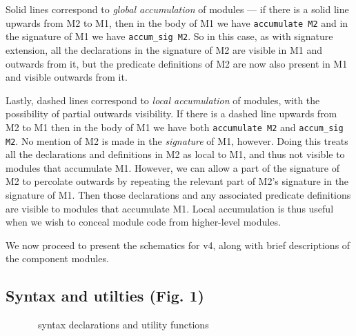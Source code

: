 Solid lines correspond to \emph{global accumulation} of modules --- if
there is a solid line upwards from M2 to M1, then in the body of M1 we
have {\tt accumulate M2} and in the signature of M1 we have
{\tt accum\_sig M2}.  So in this case, as with signature extension, all
the declarations in the signature of M2 are visible in M1 and outwards
from it, but the predicate definitions of M2 are now also present in
M1 and visible outwards from it.

Lastly, dashed lines correspond to \emph{local accumulation} of
modules, with the possibility of partial outwards visibility.  If
there is a dashed line upwards from M2 to M1 then in the body of M1 we
have both {\tt accumulate M2} and {\tt accum\_sig M2}.  No mention of
M2 is made in the \emph{signature} of M1, however.  Doing this treats
all the declarations and definitions in M2 as local to M1, and thus
not visible to modules that accumulate M1.  However, we can allow a
part of the signature of M2 to percolate outwards by repeating the
relevant part of M2's signature in the signature of M1.  Then those
declarations and any associated predicate definitions are visible to
modules that accumulate M1.  Local accumulation is thus useful when we
wish to conceal module code from higher-level modules.

We now proceed to present the schematics for \lclam v4, along with
brief descriptions of the component modules.

\subsection{Syntax and utilties (Fig. 1)}

\begin{figure}
\begin{center}
\end{center}
\caption{\lclam\ syntax declarations and utility functions}
\end{figure}

